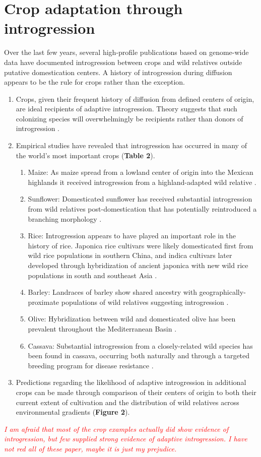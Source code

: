 \documentclass[11pt]{article}
\newcommand{\lwang}[1]{\textcolor{red}{ \emph{\scriptsize  #1}} } %
\begin{document}
\section*{Crop adaptation through introgression}
Over the last few years, several high-profile publications based on genome-wide data have documented introgression between crops and wild relatives outside putative domestication centers. A history of introgression during diffusion appears to be the rule for crops rather than the exception.
\begin{enumerate}
	\item{Crops, given their frequent history of diffusion from defined centers of origin, are ideal recipients of adaptive introgression. Theory suggests that such colonizing species will overwhelmingly be recipients rather than donors of introgression \cite{Currat2008}.}
	\item{Empirical studies have revealed that introgression has occurred in many of the world's most important crops (\textbf{Table 2}).}
	\begin{enumerate}
		\item{Maize: As maize spread from a lowland center of origin into the Mexican highlands it received introgression from a highland-adapted wild relative \cite{Hufford2013}.}
		\item{Sunflower: Domesticated sunflower has received substantial introgression from wild relatives post-domestication that has potentially reintroduced a branching morphology \cite{Baute2015}.}
		\item{Rice: Introgression appears to have played an important role in the history of rice.  Japonica rice cultivars were likely domesticated first from wild rice populations in southern China, and indica cultivars later developed through hybridization of ancient japonica with new wild rice populations in south and southeast Asia \cite{Huang2012}.}
		\item{Barley: Landraces of barley show shared ancestry with geographically-proximate populations of wild relatives suggesting introgression \cite{Poets2015}.}
		\item{Olive: Hybridization between wild and domesticated olive has been prevalent throughout the Mediterranean Basin \cite{Diez2015}.}
		\item{Cassava: Substantial introgression from a closely-related wild species has been found in cassava, occurring both naturally and through a targeted breeding program for disease resistance \cite{Bredeson2016}.}
	\end{enumerate}
	\item{Predictions regarding the likelihood of adaptive introgression in additional crops can be made through comparison of their centers of origin to both their current extent of cultivation and the distribution of wild relatives across environmental gradients (\textbf{Figure 2}).}
\end{enumerate}
\lwang{I am afraid that most of the crop examples actually did show evidence of introgression, but few supplied strong evidence of adaptive introgression. I have not red all of these paper, maybe it is just my prejudice. }
\end{document}
